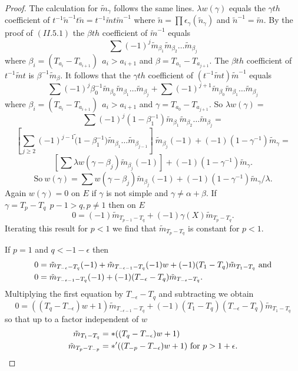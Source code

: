 \documentclass{memo-l}
\theoremstyle{definition}
\theoremstyle{remark}
\numberwithin{section}{chapter}
\numberwithin{equation}{chapter}
\begin{document}
\begin{proof}
   The calculation for $\tilde m_{{\gamma}}$ follows the same lines.
${\lambda}w({\gamma})$ equals the ${\gamma}th$ coefficient of
$t^{-1}\tilde n^{-1}t\tilde n  =  t^{-1}\tilde m t\tilde m^{-1}$ where
$\tilde n  = \prod {\epsilon}_{{\gamma}}(\tilde n_{{\gamma}})$ and
$\tilde n^{-1}  =  \tilde m.$ By the proof of $(II.5.1)$
the ${\beta}th$ coefficient of $\tilde m^{-1}$ equals
$$
\sum(-1)^{j}\tilde m_{{\beta}_{1}} \tilde m_{{\beta}_{2}}
\ldots \tilde m_{{\beta}_{j}}
$$
where ${\beta}_{i}  =  (T_{a_{i}} -T_{a_{i+1}})\ \  a_{i} > a_{i+1}$
and ${\beta} = T_{a_{1}} -T_{a_{j+1}}.$ The ${\beta}th$
coefficient of $t^{-1}\tilde m t$ is ${\beta}^{-1}\tilde m_{{\beta}}$.  It
follows that the ${\gamma}th$ coefficient of
$(t^{-1}\tilde m t)\tilde m^{-1}$ equals
$$
\sum(-1)^{j}{\beta}_{0}^{-1}\tilde m_{{\beta}_{0}}
\tilde m_{{\beta}_{1}} \ldots \tilde m_{{\beta}_{j}} +
\sum(-1)^{j+1}\tilde m_{{\beta}_{0}} \tilde m_{{\beta}_{1}}
\ldots \tilde m_{{\beta}_{j}}
$$
where ${\beta}_{i}  =  (T_{a_{i}} -T_{a_{i+1}})\ \  a_{i} > a_{i+1}$
and ${\gamma} = T_{a_{0}} -T_{a_{j+1}}.$ So
${\lambda}w({\gamma})  = $
$$
\sum(-1)^{j}(1-{\beta}_{1}^{-1})\tilde m_{{\beta}_{1}}
\tilde m_{{\beta}_{2}} \ldots \tilde m_{{\beta}_{j}}  =
$$
$$
[\sum_{j \ge  2} (-1)^{j-1}\tilde (1-\beta_1^{-1})
\tilde m_{{\beta}_{1}} \ldots \tilde m_{{\beta}_{j-1}}]\
\tilde m_{{\beta}_{j}} (-1) + (-1)(1-{\gamma}^{-1})\tilde m_{{\gamma}}  =
$$
$$
[\sum{\lambda}w({\gamma}-{\beta}_{j})\tilde m_{{\beta}_{j}} (-1)] +
(-1)(1-{\gamma}^{-1})\tilde m_{{\gamma}}.
$$
$$
{\text{So}}\  w({\gamma})  = \sum w({\gamma}-{\beta}_{j})
\tilde m_{{\beta}_{j}}(-1) + (-1)(1-{\gamma}^{-1})\tilde m_{{\gamma}}/{\lambda}.
$$
Again $w({\gamma})  =  0$ on $E$ if ${\gamma}$ is not simple and ${\gamma} \ne
{\alpha}+{\beta}$.  If ${\gamma}  =  T_{p}-T_{q} \ \ p-1>q, p \ne  1$ then on $E$
$$
0  =  (-1)\tilde m_{T_{p-1}-T_{q}} + (-1){\gamma}(X)\tilde m_{T_{p}-T_{q}}.
$$
Iterating this result for $p < 1$ we find that $\tilde m_{T_{p}-T_{q}}$
is constant for $p < 1$.

   If $p = 1$ and $q < -1-{\epsilon}$ then
$$
\aligned
0  &= \tilde m_{T_{-{\epsilon}}-T_{q}}(-1) +
\tilde m_{T_{-{\epsilon}-1}-T_{q}}(-1)w +
(-1)(T_{1}-T_{q})\tilde m_{T_{1}-T_{q}}\ {\text{and}} \\
0  &=  \tilde m_{T_{-{\epsilon}-1}-T_{q}} (-1) +
(-1)(T_{-{\epsilon}}-T_{q})\tilde m_{T_{-{\epsilon}}-T_{q}}.
\endaligned
$$
Multiplying the first equation by $T_{-{\epsilon}}-T_{q}$ and subtracting
we obtain
$$
0 =  ((T_{q}-T_{-{\epsilon}})w+1)\tilde m_{T_{-{\epsilon}-1}-T_{q}}
+ (-1)(T_{1}-T_{q})(T_{-{\epsilon}}-T_{q})\tilde m_{T_{1}-T_{q}}
$$
so that up to a factor independent of $w$
$$
\aligned
\tilde m_{T_{1}-T_{q}} &=  *((T_{q}-T_{-{\epsilon}})w+1) \\
\tilde m_{T_{p}-T_{-p}} &=  *'((T_{-p}-T_{-{\epsilon}})w+1)\ {\text{for}}\
p > 1 + {\epsilon}.
\endaligned
$$


\end{proof}
\end{document}
